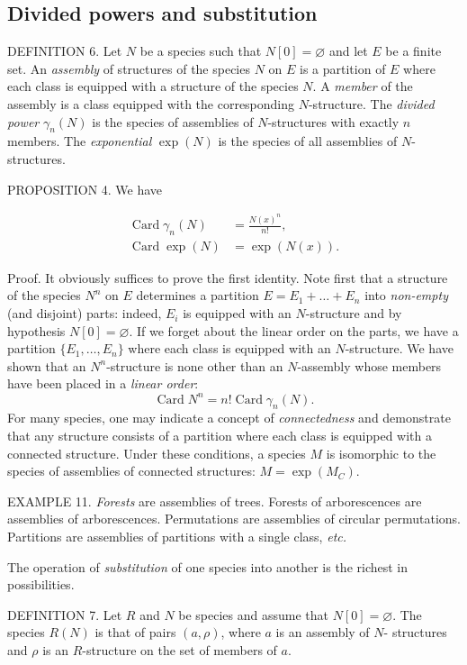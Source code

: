 \documentclass{article}
\theoremstyle{definition}
\theoremstyle{remark}
\DeclareMathOperator{\Card}{Card}
\newcommand{\term}[1]{\emph{#1}}
\newcommand{\etc}{\textit{etc.}\xspace}
\begin{document}
\subsection{Divided powers and substitution}

DEFINITION 6. Let $N$ be a species such that $N [0] = \varnothing$ and let $E$ be a
finite set. An \term{assembly} of structures of the species $N$ on $E$ is a partition
of $E$ where each class is equipped with a structure of the species $N$.
A \term{member} of the assembly is a class equipped with the corresponding $N$-structure. The
\term{divided power} $\gamma_n(N)$ is the species of assemblies of $N$-structures with
exactly $n$ members. The \term{exponential} $\exp (N)$ is the species of all
assemblies of $N$-structures.

PROPOSITION 4. We have

\begin{align*}
\Card \gamma_n(N) &= \frac{N(x)^n}{n!}, \\
\Card \exp (N) &= \exp (N (x)).
\end{align*}

Proof. It obviously suffices to prove the first identity.  Note first
that a structure of the species $N^n$ on $E$ determines a partition $E
= E_1 + \dots + E_n$ into \emph{non-empty} (and disjoint) parts:
indeed, $E_i$ is equipped with an $N$-structure and by hypothesis $N
[0] = \varnothing$. If we forget about the linear order on the parts,
we have a partition $\{E_1, \dots, E_n\}$ where each class is equipped
with an $N$-structure. We have shown that an $N^n$-structure is none
other than an $N$-assembly whose members have been placed in a
\emph{linear order}:
\[ \Card N^n = n! \Card \gamma_n(N). \]
For many species, one may indicate a concept of \term{connectedness}
and demonstrate that any structure consists of a partition
where each class is equipped with a connected structure. Under these conditions, a
species $M$ is isomorphic to the species of assemblies of connected structures:
$M = \exp (M_C)$.

EXAMPLE 11. \term{Forests} are assemblies of trees. Forests of
arborescences are assemblies of arborescences. Permutations are
assemblies of circular permutations. Partitions are assemblies of
partitions with a single class, \etc

The operation of \term{substitution} of one species into another is
the richest in possibilities.

DEFINITION 7. Let $R$ and $N$ be species and assume that $N [0] = \varnothing$.
The species $R (N)$ is that of pairs $(a, \rho)$, where $a$ is an assembly of $N$-
structures and $\rho$ is an $R$-structure on the set of members of $a$.
\end{document}
